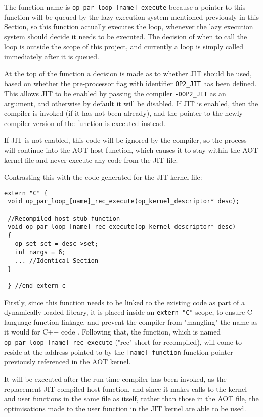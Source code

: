 The function name is \verb|op_par_loop_[name]_execute| because a pointer to this function will be queued by the lazy execution system mentioned previously in this Section, so this function actually executes the loop, whenever the lazy execution system should decide it needs to be executed. The decision of when to call the loop is outside the scope of this project, and currently a loop is simply called immediately after it is queued.
\par At the top of the function a decision is made as to whether JIT should be used, based on whether the pre-processor flag with identifier \verb|OP2_JIT| has been defined. This allows JIT to be enabled by passing the compiler \verb|-DOP2_JIT| as an argument, and otherwise by default it will be disabled. If JIT is enabled, then the compiler is invoked (if it has not been already), and the pointer to the newly compiler version of the function is executed instead.
\par
If JIT is not enabled, this code will be ignored by the compiler, so the process will continue into the AOT host function, which causes it to stay within the AOT kernel file and never execute any code from the JIT file.

Contrasting this with the code generated for the JIT kernel file:

\begin{lstlisting}[linewidth = \textwidth, framesep=0pt, linebackgroundcolor={\ifnum\value{lstnumber}<10 \ifnum\value{lstnumber}>6 \color{red!20} \else \color{green!20} \fi \else \color{green!20} \fi}]
 extern "C" {
 void op_par_loop_[name]_rec_execute(op_kernel_descriptor* desc);

 //Recompiled host stub function
 void op_par_loop_[name]_rec_execute(op_kernel_descriptor* desc)
 {
   op_set set = desc->set;
   int nargs = 6;
   ... //Identical Section
 }

 } //end extern c
\end{lstlisting}


Firstly, since this function needs to be linked to the existing code as part of a dynamically loaded library, it is placed inside an \verb|extern "C"| scope, to ensure C language function linkage, and prevent the compiler from "mangling" the name as it would for C++ code \cite{linkage}. Following that, the function, which is named\\
\verb|op_par_loop_[name]_rec_execute| ("rec" short for recompiled), will come to reside at the address pointed to by the \verb|[name]_function| function pointer previously referenced in the AOT kernel.
\par
It will be executed after the run-time compiler has been invoked, as the replacement JIT-compiled host function, and since it makes calls to the kernel and user functions in the same file as itself, rather than those in the AOT file, the optimisations made to the user function in the JIT kernel are able to be used.

